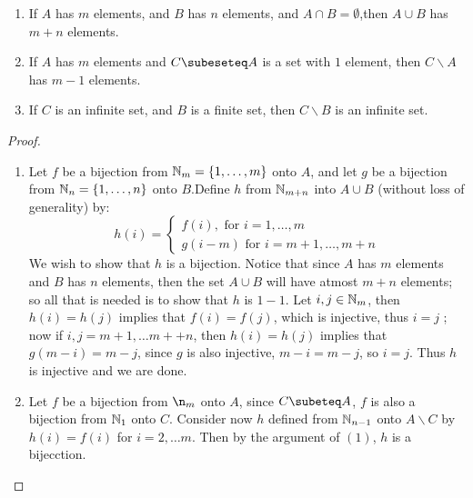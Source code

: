 \begin{theorem}
    \begin{enumerate}[label=(\arabic*)]
        \item If $A$ has $m$ elements, and  $B$ has  $n$ elements, and $A \cap B=\emptyset$,then $A \cup B$ has $m+n$ 
            elements.

        \item If $A$ has $m$ elements and  $C \subeseteq A$ is a set with  $1$ element, then $C \backslash A$ has $m-1$ 
            elements.

        \item If  $C$ is an infinite set, and  $B$ is a finite set, then $C \backslash B$ is an infinite set.
    \end{enumerate}
\end{theorem}
\begin{proof}
    \begin{enumerate}[label=(\arabic*)]
        \item 	Let $f$ be a bijection from  $\mathbb{N}_m=\{1, \dots, m\}$ onto $A$, and let  $g$ be a bijection from  $\mathbb{N}_n=\{1, \dots, n\}$ 
    onto $B$.Define  $h$ from $\mathbb{N}_{m+n}$ into $A \cup B$ (without loss of generality) by:
        \begin{equation}
            h(i) = \begin{cases}
                        f(i), \text{ for } i=1,\dots,m \\
                        g(i-m) \text{ for } i=m+1,\dots,m+n  
                   \end{cases}
        \end{equation}
    We wish to show that $h$ is a bijection. Notice that since $A$ has  $m$ elements and  $B$ has $n$ elements, then the set 
    $A \cup B$ will have atmost $m+n$ elements; so all that is needed is to show that  $h$ is  $1-1$. Let  $i,j \in \mathbb{N}_m$, 
    then $h(i)=h(j)$ implies that  $f(i)=f(j)$, which is injective, thus  $i=j$ ; now if $i,j = m+1, \dots m++n$, then  $h(i)=h(j)$ 
    implies that  $g(m-i)=m-j$, since  $g$ is also injective,  $m-i=m-j$, so  $i=j$. Thus  $h$ is injective and we are done.

        \item Let $f$ be a bijection from  $\n_m$ onto $A$, since  $C \subeteq A$,  $f$ is also a bijection from  $\mathbb{N}_1$ 
    onto $C$. Consider now  $h$ defined from $\mathbb{N}_{n-1}$ onto  $A \backslash C$ by  $h(i)=f(i)$ for $i=2, \dots m$. 
    Then by the argument of  $(1)$,  $h$ is a bijecction.


\end{enumerate}
\end{proof}

